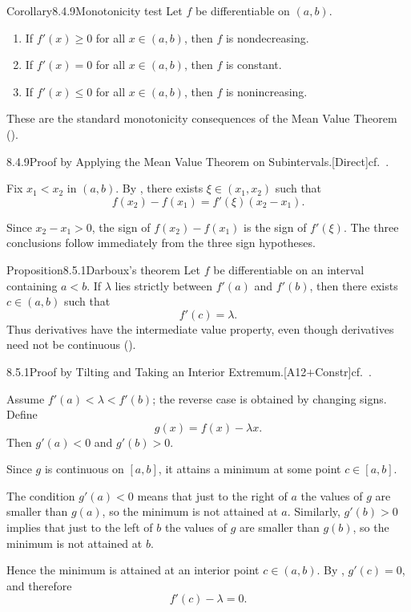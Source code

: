 \documentclass[main.tex]{subfiles}
\begin{document}
\begin{Obj}{Corollary}{8.4.9}{Monotonicity test}
Let $f$ be differentiable on $(a,b)$.
\begin{enumerate}
  \item If $f'(x)\ge0$ for all $x\in(a,b)$, then $f$ is nondecreasing.
  \item If $f'(x)=0$ for all $x\in(a,b)$, then $f$ is constant.
  \item If $f'(x)\le0$ for all $x\in(a,b)$, then $f$ is nonincreasing.
\end{enumerate}
These are the standard monotonicity consequences of the Mean Value Theorem ().
\end{Obj}

\begin{Prf}{8.4.9}{Proof by Applying the Mean Value Theorem on Subintervals.}{[Direct]\quad cf.\ .}
\item Fix $x_1<x_2$ in $(a,b)$. By , there exists $\xi\in(x_1,x_2)$ such that
  \[
    f(x_2)-f(x_1)=f'(\xi)(x_2-x_1).
  \]
\item Since $x_2-x_1>0$, the sign of $f(x_2)-f(x_1)$ is the sign of $f'(\xi)$. The three
  conclusions follow immediately from the three sign hypotheses.
\end{Prf}


\begin{Obj}{Proposition}{8.5.1}{Darboux's theorem}
Let $f$ be differentiable on an interval containing $a<b$. If $\lambda$ lies strictly
between $f'(a)$ and $f'(b)$, then there exists $c\in(a,b)$ such that
\[
  f'(c)=\lambda .
\]
Thus derivatives have the intermediate value property, even though derivatives need not be
continuous ().
\end{Obj}

\begin{Prf}{8.5.1}{Proof by Tilting and Taking an Interior Extremum.}{[A12$+$Constr]\quad cf.\ .}
\item Assume $f'(a)<\lambda<f'(b)$; the reverse case is obtained by changing signs. Define
  \[
    g(x)=f(x)-\lambda x.
  \]
  Then $g'(a)<0$ and $g'(b)>0$.
\item Since $g$ is continuous on $[a,b]$, it attains a minimum at some point $c\in[a,b]$.
\item The condition $g'(a)<0$ means that just to the right of $a$ the values of $g$ are
  smaller than $g(a)$, so the minimum is not attained at $a$. Similarly, $g'(b)>0$ implies
  that just to the left of $b$ the values of $g$ are smaller than $g(b)$, so the minimum is
  not attained at $b$.
\item Hence the minimum is attained at an interior point $c\in(a,b)$. By ,
  $g'(c)=0$, and therefore
  \[
    f'(c)-\lambda=0.
  \]
\end{Prf}
\end{document}
